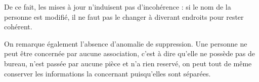 	De ce fait, les mises à jour n'induisent pas d'incohérence : si le nom de la personne est modifié, il ne faut pas le changer à diverant endroits pour rester cohérent.
	
	On remarque également l'absence d'anomalie de suppression. Une personne ne peut être concernée par aucune association, c'est à dire qu'elle ne possède pas de bureau, n'est passée par aucune pièce et n'a rien reservé, on peut tout de même conserver les informations la concernant puisqu'elles sont séparées.
